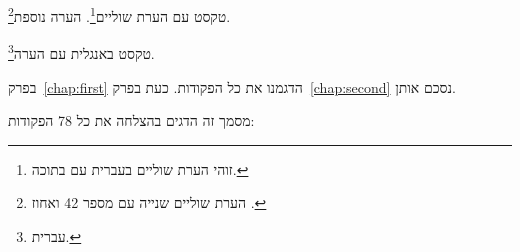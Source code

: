 \documentclass{hebrew-academic-template}
\begin{document}
טקסט עם הערת שוליים\footnote{זוהי הערת שוליים בעברית עם  בתוכה.}.
הערה נוספת\footnote{הערת שוליים שנייה עם מספר \num{42} ואחוז .}.

טקסט באנגלית עם הערה\footnote{ עברית.}.




בפרק~\ref{chap:first} הדגמנו את כל הפקודות. כעת בפרק~\ref{chap:second} נסכם אותן.

מסמך זה הדגים בהצלחה את כל \num{78} הפקודות:
\end{document}
